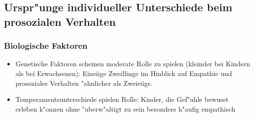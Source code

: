 \subsection{Urspr"unge individueller Unterschiede beim prosozialen Verhalten}
\subsubsection{Biologische Faktoren}
\begin{itemize}
	\item
		Genetische Faktoren scheinen moderate Rolle zu spielen (kleinder bei Kindern als bei Erwachsenen): Eineiige Zweillinge im Hinblick auf Empathie und prosoziales Verhalten "ahnlicher als Zweieiige. 
	\item
		Temperamentsunterschiede spielen Rolle: Kinder, die Gef"uhle bewusst erleben k"onnen ohne "uberw"altigt zu sein besonders h"aufig empathisch
\end{itemize}
